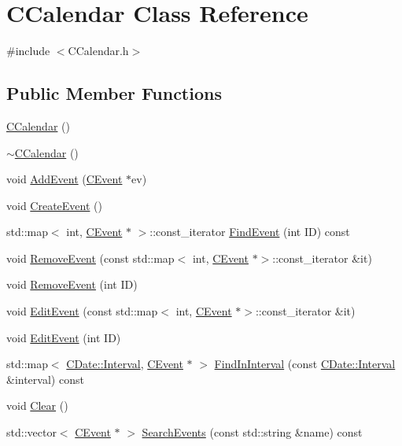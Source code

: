 \hypertarget{class_c_calendar}{}\section{C\+Calendar Class Reference}
\label{class_c_calendar}


{\ttfamily \#include $<$C\+Calendar.\+h$>$}

\subsection*{Public Member Functions}
\begin{DoxyCompactItemize}
\item 
\mbox{\hyperlink{class_c_calendar_aa3fe418a1d8f93508047f923eb229b56}{C\+Calendar}} ()
\item 
\mbox{\hyperlink{class_c_calendar_af0c5cbee7d55fefa23f340cecbd45ec9}{$\sim$\+C\+Calendar}} ()
\item 
void \mbox{\hyperlink{class_c_calendar_a8ab0b10b7e49fd718224e982009a2d5d}{Add\+Event}} (\mbox{\hyperlink{class_c_event}{C\+Event}} $\ast$ev)
\item 
void \mbox{\hyperlink{class_c_calendar_a07b2bad77df73457a930c9df19ef1719}{Create\+Event}} ()
\item 
std\+::map$<$ int, \mbox{\hyperlink{class_c_event}{C\+Event}} $\ast$ $>$\+::const\+\_\+iterator \mbox{\hyperlink{class_c_calendar_abdb8378eabf26455d239222e66f73976}{Find\+Event}} (int ID) const
\item 
void \mbox{\hyperlink{class_c_calendar_a34a4175ed902ac35803f45a39b7dfc97}{Remove\+Event}} (const std\+::map$<$ int, \mbox{\hyperlink{class_c_event}{C\+Event}} $\ast$$>$\+::const\+\_\+iterator \&it)
\item 
void \mbox{\hyperlink{class_c_calendar_aa3fe3ae0f796ea634ba5a52bf1fb5018}{Remove\+Event}} (int ID)
\item 
void \mbox{\hyperlink{class_c_calendar_a4563ae3538b60e88bb3a80d9f9638656}{Edit\+Event}} (const std\+::map$<$ int, \mbox{\hyperlink{class_c_event}{C\+Event}} $\ast$$>$\+::const\+\_\+iterator \&it)
\item 
void \mbox{\hyperlink{class_c_calendar_af881187353fc545c859db39e39d7ec71}{Edit\+Event}} (int ID)
\item 
std\+::map$<$ \mbox{\hyperlink{class_c_date_af23472c977b14ed341b48183ec19d874}{C\+Date\+::\+Interval}}, \mbox{\hyperlink{class_c_event}{C\+Event}} $\ast$ $>$ \mbox{\hyperlink{class_c_calendar_a0aef6d7f619303453472c9c777c44d16}{Find\+In\+Interval}} (const \mbox{\hyperlink{class_c_date_af23472c977b14ed341b48183ec19d874}{C\+Date\+::\+Interval}} \&interval) const
\item 
void \mbox{\hyperlink{class_c_calendar_a06a93725e2469018efee85284e8bd227}{Clear}} ()
\item 
std\+::vector$<$ \mbox{\hyperlink{class_c_event}{C\+Event}} $\ast$ $>$ \mbox{\hyperlink{class_c_calendar_a3dd85785e82ba22e18d52458eb767e02}{Search\+Events}} (const std\+::string \&name) const
\end{DoxyCompactItemize}


